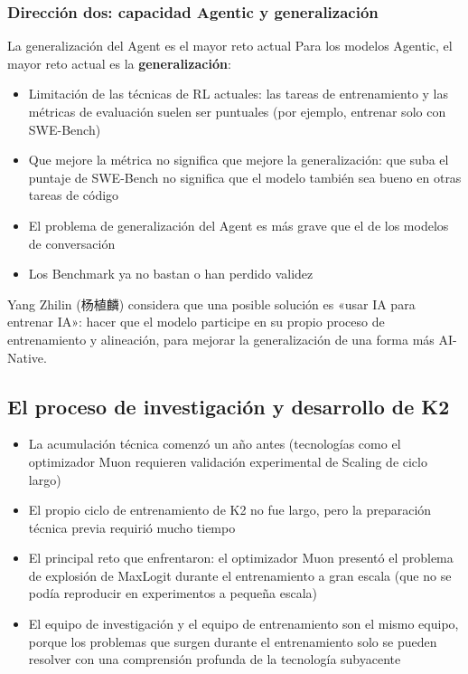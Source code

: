 \subsubsection{Dirección dos: capacidad Agentic y generalización}

\begin{importantbox}{La generalización del Agent es el mayor reto actual}
Para los modelos Agentic, el mayor reto actual es la \textbf{generalización}:
\begin{itemize}
    \item Limitación de las técnicas de RL actuales: las tareas de entrenamiento y las métricas de evaluación suelen ser puntuales (por ejemplo, entrenar solo con SWE-Bench)
    \item Que mejore la métrica no significa que mejore la generalización: que suba el puntaje de SWE-Bench no significa que el modelo también sea bueno en otras tareas de código
    \item El problema de generalización del Agent es más grave que el de los modelos de conversación
    \item Los Benchmark ya no bastan o han perdido validez
\end{itemize}
\end{importantbox}

Yang Zhilin (杨植麟) considera que una posible solución es «usar IA para entrenar IA»: hacer que el modelo participe en su propio proceso de entrenamiento y alineación, para mejorar la generalización de una forma más AI-Native.

\subsection{El proceso de investigación y desarrollo de K2}

\begin{itemize}
    \item La acumulación técnica comenzó un año antes (tecnologías como el optimizador Muon requieren validación experimental de Scaling de ciclo largo)
    \item El propio ciclo de entrenamiento de K2 no fue largo, pero la preparación técnica previa requirió mucho tiempo
    \item El principal reto que enfrentaron: el optimizador Muon presentó el problema de explosión de MaxLogit durante el entrenamiento a gran escala (que no se podía reproducir en experimentos a pequeña escala)
    \item El equipo de investigación y el equipo de entrenamiento son el mismo equipo, porque los problemas que surgen durante el entrenamiento solo se pueden resolver con una comprensión profunda de la tecnología subyacente
\end{itemize}


